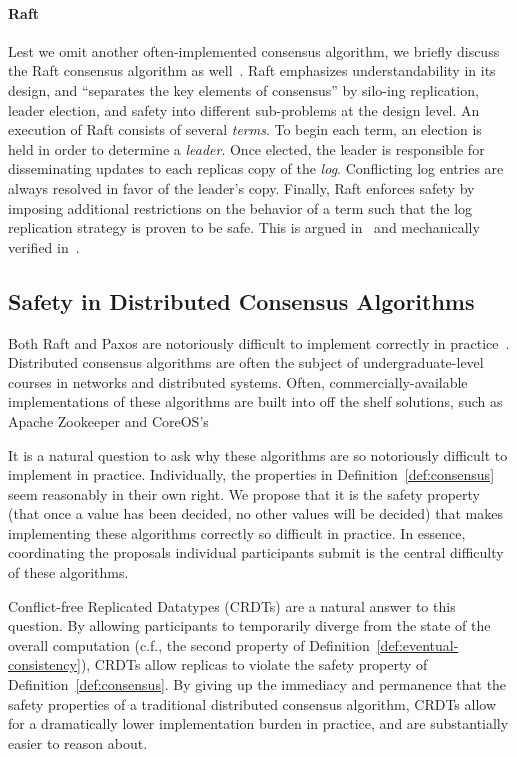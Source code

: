 \paragraph{Raft}
Lest we omit another often-implemented consensus algorithm, we briefly discuss
the Raft consensus algorithm as well~\citep{ongaro14}. Raft emphasizes
understandability in its design, and ``separates the key elements of consensus''
by silo-ing replication, leader election, and safety into different sub-problems
at the design level. An execution of Raft consists of several \textit{terms}. To
begin each term, an election is held in order to determine a \textit{leader}.
Once elected, the leader is responsible for disseminating updates to each
replicas copy of the \textit{log}. Conflicting log entries are always resolved
in favor of the leader's copy. Finally, Raft enforces safety by imposing
additional restrictions on the behavior of a term such that the log replication
strategy is proven to be safe. This is argued in~\citep{ongaro14} and
mechanically verified in~\citep{wilcox15}.

\subsection{Safety in Distributed Consensus Algorithms}

Both Raft and Paxos are notoriously difficult to implement correctly in
practice~\citep{howard20}. Distributed consensus algorithms are often the
subject of undergraduate-level courses in networks and distributed systems.
Often, commercially-available implementations of these algorithms are built into
off the shelf solutions, such as Apache Zookeeper and CoreOS's

It is a natural question to ask why these algorithms are so notoriously
difficult to implement in practice. Individually, the properties
in Definition~\ref{def:consensus} seem reasonably in their own right. We propose
that it is the safety property (that once a value has been decided, no other
values will be decided) that makes implementing these algorithms correctly so
difficult in practice. In essence, coordinating the proposals individual
participants submit is the central difficulty of these algorithms.

Conflict-free Replicated Datatypes (CRDTs) are a natural answer to this
question. By allowing participants to temporarily diverge from the state of the
overall computation (c.f., the second property of
Definition~\ref{def:eventual-consistency}), CRDTs allow replicas to violate the
safety property of Definition~\ref{def:consensus}. By giving up the immediacy
and permanence that the safety properties of a traditional distributed consensus
algorithm, CRDTs allow for a dramatically lower implementation burden in
practice, and are substantially easier to reason about.

